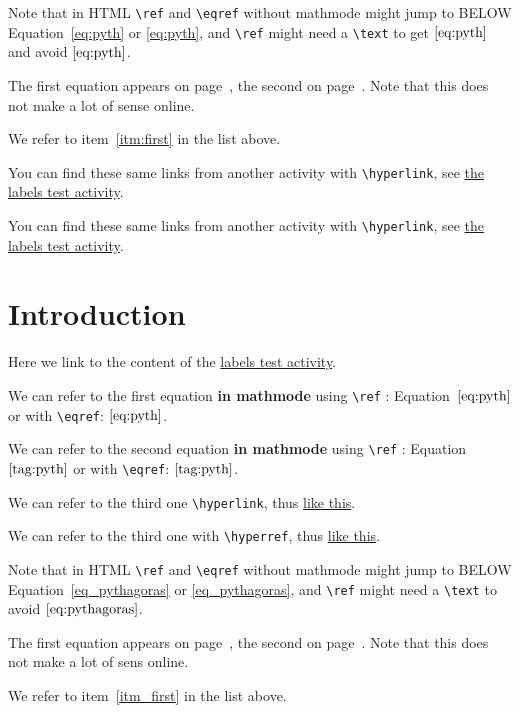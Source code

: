 \documentclass{ximera}
\begin{document}
Note that in HTML \verb|\ref| and \verb|\eqref| without mathmode might jump to BELOW Equation~\ref{eq:pyth} or \eqref{eq:pyth}, and
\verb|\ref| might need a \verb|\text| to get $\text{\ref{eq:pyth}}$ and avoid $\ref{eq:pyth}$.

The first equation appears on page~\pageref{eq:pyth}, the second on page~\pageref{tag:pyth}. 
Note that this does not make a lot of sense online.

We refer to item~\ref{itm:first} in the list above.

You can find these same links from another activity with \verb|\hyperlink|, see \hyperlink{xim_labelsFromOtherActivity}{the labels test activity}.

You can find these same links from another activity with \verb|\hyperlink|, see \hyperref[xim_labelsFromOtherActivity]{the labels test activity}.




\section{Introduction}
\label{sec:intro} %
 
Here we link to the content of the \hyperlink{xim:labels}{labels test activity}.


We can refer to the first equation \textbf{in mathmode} using \verb|\ref| : Equation~$\ref{eq:pyth}$ or with \verb|\eqref|: $\eqref{eq:pyth}$.

We can refer to the second equation \textbf{in mathmode} using \verb|\ref| : Equation~$\text{\ref{tag:pyth}}$ or with \verb|\eqref|: $\eqref{tag:pyth}$.

We can refer to the third one  \verb|\hyperlink|, thus \hyperlink{ht:pyth}{like this}.

We can refer to the third one with \verb|\hyperref|, thus \hyperref[ht:pyth]{like this}.

Note that in HTML \verb|\ref| and \verb|\eqref| without mathmode might jump to BELOW Equation~\ref{eq_pythagoras} or \eqref{eq_pythagoras}, and
\verb|\ref| might need a \verb|\text| to avoid $\ref{eq:pythagoras}$.

The first equation appears on page~\pageref{eq:pythagoras}, the second on page~\pageref{eq:tag:pythagoras}. 
Note that this does not make a lot of sens online.

We refer to item~\ref{itm_first} in the list above.

\
\end{document}

